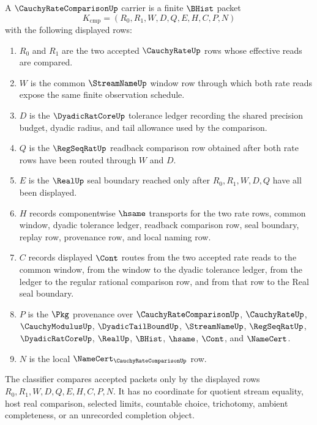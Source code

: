 \begin{definition}
\label{def:cauchy-rate-comparison-carrier}
A $\CauchyRateComparisonUp$ carrier is a finite $\BHist$ packet
$$
K_{\mathrm{cmp}}=(R_0,R_1,W,D,Q,E,H,C,P,N)
$$
with the following displayed rows:
\begin{enumerate}
\item $R_0$ and $R_1$ are the two accepted $\CauchyRateUp$ rows whose effective reads are compared.
\item $W$ is the common $\StreamNameUp$ window row through which both rate reads expose the same finite observation schedule.
\item $D$ is the $\DyadicRatCoreUp$ tolerance ledger recording the shared precision budget, dyadic radius, and tail allowance used by the comparison.
\item $Q$ is the $\RegSeqRatUp$ readback comparison row obtained after both rate rows have been routed through $W$ and $D$.
\item $E$ is the $\RealUp$ seal boundary reached only after $R_0,R_1,W,D,Q$ have all been displayed.
\item $H$ records componentwise $\hsame$ transports for the two rate rows, common window, dyadic tolerance ledger, readback comparison row, seal boundary, replay row, provenance row, and local naming row.
\item $C$ records displayed $\Cont$ routes from the two accepted rate reads to the common window, from the window to the dyadic tolerance ledger, from the ledger to the regular rational comparison row, and from that row to the Real seal boundary.
\item $P$ is the $\Pkg$ provenance over $\CauchyRateComparisonUp$, $\CauchyRateUp$, $\CauchyModulusUp$, $\DyadicTailBoundUp$, $\StreamNameUp$, $\RegSeqRatUp$, $\DyadicRatCoreUp$, $\RealUp$, $\BHist$, $\hsame$, $\Cont$, and $\NameCert$.
\item $N$ is the local $\NameCert_{\CauchyRateComparisonUp}$ row.
\end{enumerate}
The classifier compares accepted packets only by the displayed rows $R_0,R_1,W,D,Q,E,H,C,P,N$. It has no coordinate for quotient stream equality, host real comparison, selected limits, countable choice, trichotomy, ambient completeness, or an unrecorded completion object.
\end{definition}

